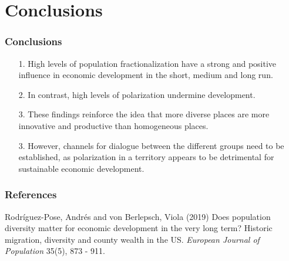 \documentclass[pdftex,12pt,xcolor=pdftex,table]{beamer}
\begin{document}
\section{Conclusions}

\begin{frame}
\frametitle{Conclusions}
\begin{enumerate}
\item[1.] High levels of population fractionalization have a strong and positive influence in economic development in the short, medium and long run.
\item[2.] In contrast, high levels of polarization undermine development.
\item[3.] These findings reinforce the idea that more diverse places are more innovative and productive than homogeneous places.
\item[3.] However, channels for dialogue between the different groups need to be established, as polarization in a territory appears to be detrimental for sustainable economic development. 
\end{enumerate}

\end{frame}


\begin{frame}
\frametitle{References}
\footnotesize{
\begin{thebibliography}{99} 
 Rodríguez-Pose, Andrés and von Berlepsch, Viola (2019)
\newblock Does population diversity matter for economic development in the very long term? Historic migration, diversity and county wealth in the US.
\newblock \emph{European Journal of Population} 35(5), 873 - 911.
\end{thebibliography}
}
\end{frame}

\end{document}
